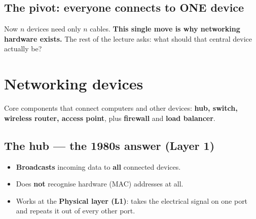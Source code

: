 \subsection{The pivot: everyone connects to ONE device}
\begin{center}
\end{center}
Now $n$ devices need only $n$ cables. \textbf{This single move is why networking hardware exists.} The rest of the lecture asks: what should that central device actually be?

\section{Networking devices}
Core components that connect computers and other devices: \textbf{hub, switch, wireless router, access point}, plus \textbf{firewall} and \textbf{load balancer}.

\subsection{The hub --- the 1980s answer (Layer 1)}
\begin{itemize}
  \item \textbf{Broadcasts} incoming data to \textbf{all} connected devices.
  \item Does \textbf{not} recognise hardware (MAC) addresses at all.
  \item Works at the \textbf{Physical layer (L1)}: takes the electrical signal on one port and repeats it out of every other port.
\end{itemize}

